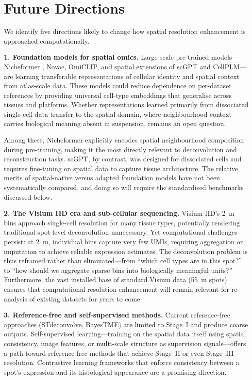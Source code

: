 \section{Future Directions}
\label{sec:future}

We identify five directions likely to change how spatial resolution enhancement is approached computationally.

\textbf{1. Foundation models for spatial omics.}
Large-scale pre-trained models---Nicheformer \citep{nicheformer2024}, Novae, OmiCLIP, and spatial extensions of scGPT \citep{cui2024scgpt} and CellPLM---are learning transferable representations of cellular identity and spatial context from atlas-scale data. These models could reduce dependence on per-dataset references by providing universal cell-type embeddings that generalise across tissues and platforms. Whether representations learned primarily from dissociated single-cell data transfer to the spatial domain, where neighbourhood context carries biological meaning absent in suspension, remains an open question.

Among these, Nicheformer explicitly encodes spatial neighbourhood composition during pre-training, making it the most directly relevant to deconvolution and reconstruction tasks. scGPT, by contrast, was designed for dissociated cells and requires fine-tuning on spatial data to capture tissue architecture. The relative merits of spatial-native versus adapted foundation models have not been systematically compared, and doing so will require the standardised benchmarks discussed below.

\textbf{2. The Visium HD era and sub-cellular sequencing.}
Visium HD's 2~\textmu m bins approach single-cell resolution for many tissue types, potentially rendering traditional spot-level deconvolution unnecessary. Yet computational challenges persist: at 2~\textmu m, individual bins capture very few UMIs, requiring aggregation or imputation to achieve reliable expression estimates. The deconvolution problem is thus reframed rather than eliminated---from ``which cell types are in this spot?'' to ``how should we aggregate sparse bins into biologically meaningful units?'' Furthermore, the vast installed base of standard Visium data (55~\textmu m spots) ensures that computational resolution enhancement will remain relevant for re-analysis of existing datasets for years to come.

\textbf{3. Reference-free and self-supervised methods.}
Current reference-free approaches (STdeconvolve, BayesTME) are limited to Stage~I and produce coarse outputs. Self-supervised learning---training on the spatial data itself using spatial consistency, image features, or multi-scale structure as supervision signals---offers a path toward reference-free methods that achieve Stage~II or even Stage~III resolution. Contrastive learning frameworks that enforce consistency between a spot's expression and its histological appearance are a promising direction.

